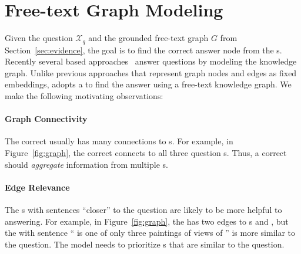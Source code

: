 \section{Free-text Graph Modeling}
\label{sec:model}


Given the question $\mathcal{X}_q$ and the grounded free-text graph
$G$ from Section~\ref{sec:evidence}, the goal is to find the correct
answer node from the \rightnode{}s.  Recently several  based
approaches~\cite{tu-etal-2019-multi, de2018question} answer questions
by modeling the knowledge graph.
%
Unlike previous approaches that represent graph nodes and edges as fixed embeddings, 
\name{} adopts a  to find the answer using  
a free-text knowledge graph.
We make the following motivating observations:


\paragraph{Graph Connectivity}

The correct \rightnode{} usually has many connections to \leftnode{}s.
%
For example, in Figure~\ref{fig:graph}, the correct \rightnode{}
 connects to all three question \leftnode{}s.
%
Thus, a correct \rightnode{} should \textit{aggregate} information
from multiple \leftnode{}s.


\paragraph{Edge Relevance}
The \tweennode{}s with sentences ``closer'' to the question
are likely to be more helpful to answering.
%
For example, in Figure~\ref{fig:graph}, the \leftnode{}
 has two edges to \rightnode{}s
 and , but the \tweennode{} with sentence
`` is one of only three paintings of views of ''
is more similar to the question.
The model needs to prioritize \tweennode{}s that are similar to the question.

